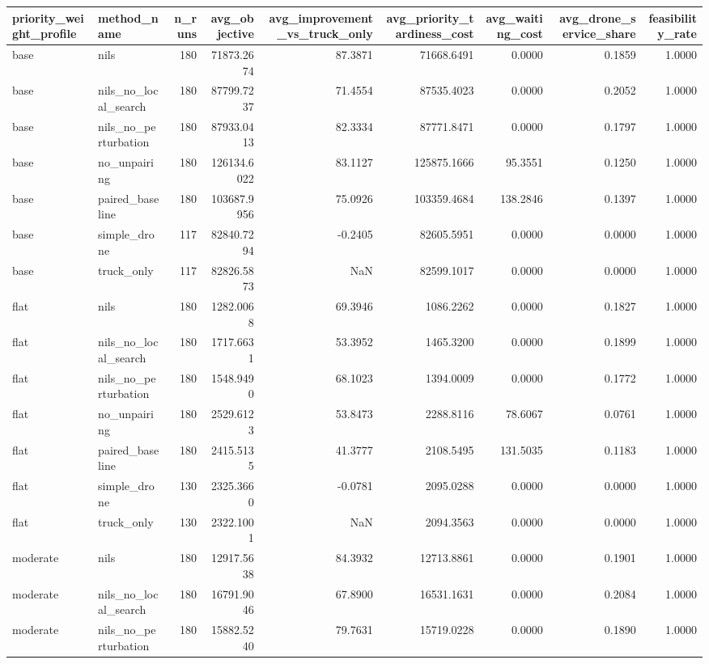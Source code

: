 \begin{tabular}{llrrrrrrr}
\toprule
priority_weight_profile & method_name & n_runs & avg_objective & avg_improvement_vs_truck_only & avg_priority_tardiness_cost & avg_waiting_cost & avg_drone_service_share & feasibility_rate \\
\midrule
base & nils & 180 & 71873.2674 & 87.3871 & 71668.6491 & 0.0000 & 0.1859 & 1.0000 \\
base & nils_no_local_search & 180 & 87799.7237 & 71.4554 & 87535.4023 & 0.0000 & 0.2052 & 1.0000 \\
base & nils_no_perturbation & 180 & 87933.0413 & 82.3334 & 87771.8471 & 0.0000 & 0.1797 & 1.0000 \\
base & no_unpairing & 180 & 126134.6022 & 83.1127 & 125875.1666 & 95.3551 & 0.1250 & 1.0000 \\
base & paired_baseline & 180 & 103687.9956 & 75.0926 & 103359.4684 & 138.2846 & 0.1397 & 1.0000 \\
base & simple_drone & 117 & 82840.7294 & -0.2405 & 82605.5951 & 0.0000 & 0.0000 & 1.0000 \\
base & truck_only & 117 & 82826.5873 & NaN & 82599.1017 & 0.0000 & 0.0000 & 1.0000 \\
flat & nils & 180 & 1282.0068 & 69.3946 & 1086.2262 & 0.0000 & 0.1827 & 1.0000 \\
flat & nils_no_local_search & 180 & 1717.6631 & 53.3952 & 1465.3200 & 0.0000 & 0.1899 & 1.0000 \\
flat & nils_no_perturbation & 180 & 1548.9490 & 68.1023 & 1394.0009 & 0.0000 & 0.1772 & 1.0000 \\
flat & no_unpairing & 180 & 2529.6123 & 53.8473 & 2288.8116 & 78.6067 & 0.0761 & 1.0000 \\
flat & paired_baseline & 180 & 2415.5135 & 41.3777 & 2108.5495 & 131.5035 & 0.1183 & 1.0000 \\
flat & simple_drone & 130 & 2325.3660 & -0.0781 & 2095.0288 & 0.0000 & 0.0000 & 1.0000 \\
flat & truck_only & 130 & 2322.1001 & NaN & 2094.3563 & 0.0000 & 0.0000 & 1.0000 \\
moderate & nils & 180 & 12917.5638 & 84.3932 & 12713.8861 & 0.0000 & 0.1901 & 1.0000 \\
moderate & nils_no_local_search & 180 & 16791.9046 & 67.8900 & 16531.1631 & 0.0000 & 0.2084 & 1.0000 \\
moderate & nils_no_perturbation & 180 & 15882.5240 & 79.7631 & 15719.0228 & 0.0000 & 0.1890 & 1.0000 \\

\end{tabular}
